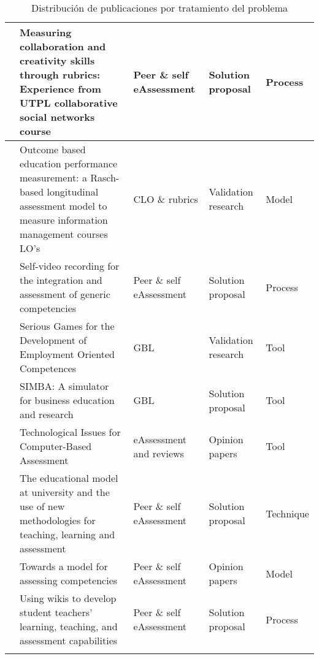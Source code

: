 \begin{landscape}
\begin{center}
\begin{longtable}{| c | m{9.5cm} | m{4cm} | m{4cm} | m{4cm} |}
    \hline
    \cite{Piedra:2010} & Measuring collaboration and creativity skills through rubrics: Experience from UTPL collaborative social networks course & Peer \& self eAssessment & Solution proposal & Process \\
    \hline
    \cite{Mohamed:2008} & Outcome based education performance measurement: a Rasch-based longitudinal assessment model to measure information management courses LO's & CLO \& rubrics & Validation research & Model \\
    \hline
    \cite{Masip-Alvarez:2013} & Self-video recording for the integration and assessment of generic competencies & Peer \& self eAssessment & Solution proposal & Process \\
    \hline
    \cite{Guenaga:2013} & Serious Games for the Development of Employment Oriented Competences  & GBL & Validation research & Tool \\
    \hline
    \cite{Borrajo:2010} & SIMBA: A simulator for business education and research & GBL & Solution proposal & Tool \\
    \hline
    \cite{BenoCsap:2012} & Technological Issues for Computer-Based Assessment & eAssessment and reviews & Opinion papers & Tool \\
    \hline
    \cite{Palomares:2011} & The educational model at university and the use of new methodologies for teaching, learning and assessment & Peer \& self eAssessment & Solution proposal & Technique \\
    \hline
    \cite{Cardona:2013} & Towards a model for assessing competencies & Peer \& self eAssessment & Opinion papers & Model \\
    \hline
    \cite{Lim:2011} & Using wikis to develop student teachers' learning, teaching, and assessment capabilities & Peer \& self eAssessment & Solution proposal & Process \\
    \hline
\caption{Distribución de publicaciones por tratamiento del problema}
\label{tab:ListadoTrabajos}
\end{longtable}
\end{center}
\end{landscape}

\pagestyle{normal}



